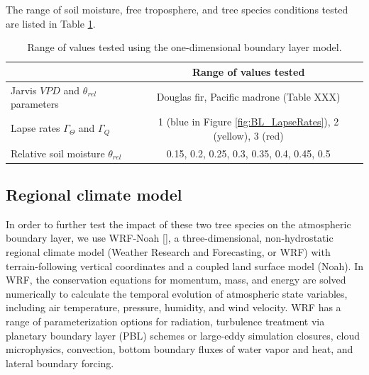 The range of soil moisture, free troposphere, and tree species conditions tested are listed in Table \ref{table:BL_1Druns}.  

\begin{table}
\begin{tabular}{ l c }
\hline
 & Range of values tested \\ \hline
Jarvis $VPD$ and $\theta_{rel}$ parameters & Douglas fir, Pacific madrone (Table XXX)\\
Lapse rates $\Gamma_{\Theta}$ and $\Gamma_Q$ & 1 (blue in Figure \ref{fig:BL_LapseRates}), 2 (yellow), 3 (red)\\
Relative soil moisture $\theta_{rel}$ & 0.15, 0.2, 0.25, 0.3, 0.35, 0.4, 0.45, 0.5\\
\hline
\end{tabular}
\caption{Range of values tested using the one-dimensional boundary layer model.}
\label{table:BL_1Druns}
\end{table}

\subsection{Regional climate model}
\label{sec:BL_WRFdesc}
In order to further test the impact of these two tree species on the atmospheric boundary layer, we use WRF-Noah [\cite{skamarock2008}], a three-dimensional, non-hydrostatic regional climate model (Weather Research and Forecasting, or WRF) with terrain-following vertical coordinates and a coupled land surface model (Noah).  In WRF, the conservation equations for momentum, mass, and energy are solved numerically to calculate the temporal evolution of atmospheric state variables, including air temperature, pressure, humidity, and wind velocity.  WRF has a range of parameterization options for radiation, turbulence treatment via planetary boundary layer (PBL) schemes or large-eddy simulation closures, cloud microphysics, convection, bottom boundary fluxes of water vapor and heat, and lateral boundary forcing.  

